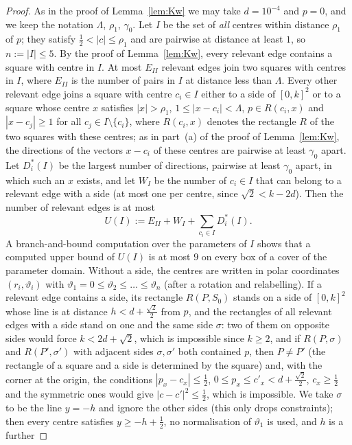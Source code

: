\documentclass[11pt]{amsart}
\theoremstyle{definition}
\theoremstyle{remark}
\begin{document}
\begin{proof}
As in the proof of Lemma~\ref{lem:Kw} we may take $d=10^{-4}$ and $p=0$, and we keep the notation $\Lambda$, $\rho_1$, $\gamma_0$.
Let $I$ be the set of \emph{all} centres within distance $\rho_1$ of $p$; they satisfy $\frac12<|c|\le\rho_1$ and are pairwise at
distance at least $1$, so $n:=|I|\le5$. By the proof of Lemma~\ref{lem:Kw}, every relevant edge contains a square with centre in
$I$. At most $E_{II}$ relevant edges join two squares with centres in $I$, where $E_{II}$ is the number of pairs in $I$ at distance
less than $\Lambda$. Every other relevant edge joins a square with centre $c_i\in I$ either to a side of $[0,k]^2$ or to a square whose
centre $x$ satisfies $|x|>\rho_1$, $1\le|x-c_i|<\Lambda$, $p\in R(c_i,x)$ and $|x-c_j|\ge1$ for all $c_j\in I\setminus\{c_i\}$, where
$R(c_i,x)$ denotes the rectangle $R$ of the two squares with these centres; as in part~(a) of
the proof of Lemma~\ref{lem:Kw}, the directions of the vectors $x-c_i$ of these centres are pairwise at least $\gamma_0$ apart. Let $D_i^*(I)$
be the largest number of directions, pairwise at least $\gamma_0$ apart, in which such an $x$ exists, and let $W_I$ be the number of
$c_i\in I$ that can belong to a relevant edge with a side (at most one per centre, since $\sqrt2<k-2d$). Then the number of relevant
edges is at most
\[
U(I):=E_{II}+W_I+\sum_{c_i\in I}D_i^*(I) .
\]
A branch-and-bound computation over the parameters of $I$ shows that a computed upper bound of $U(I)$ is at most $9$ on every
box of a cover of the parameter domain. Without a side,
the centres are written in polar coordinates $(r_i,\vartheta_i)$ with $\vartheta_1=0\le\vartheta_2\le\dots\le\vartheta_n$ (after a rotation and
relabelling). If a relevant edge contains a side, its rectangle $R(P,S_0)$ stands on a side of $[0,k]^2$ whose line is at
distance $h<d+\frac{\sqrt2}2$ from $p$, and the rectangles of all relevant edges with a side stand on one and the same side $\sigma$: two of them on opposite sides would force
$k<2d+\sqrt2$, which is impossible since $k\ge2$, and if $R(P,\sigma)$ and $R(P',\sigma')$ with adjacent sides $\sigma,\sigma'$ both contained $p$, then $P\ne P'$ (the rectangle of a square and a side is determined by the square) and, with the
corner at the origin, the conditions $|p_x-c_x|\le\frac12$, $0\le p_x\le c'_x<d+\frac{\sqrt2}2$, $c_x\ge\frac12$ and the symmetric ones would give
$|c-c'|^2\le\frac12$, which is impossible. We take $\sigma$ to be the line $y=-h$ and ignore the other sides (this only drops constraints); then every centre satisfies $y\ge-h+\frac12$, no normalisation of $\vartheta_1$ is used, and $h$ is a further

\end{proof}
\end{document}
